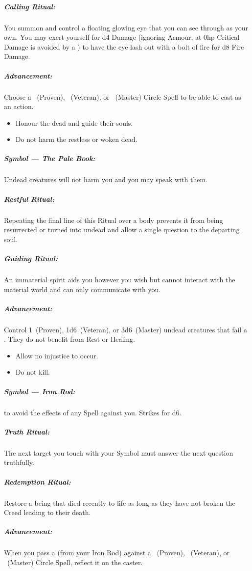 \documentclass[itdr/core]{subfiles}
\begin{document}
\subparagraph{Calling Ritual:} You summon and control a floating glowing eye that you can see through as your own. You may exert yourself for d4 Damage (ignoring Armour, at 0hp Critical Damage is avoided by a ) to have the eye lash out with a bolt of fire for d8 Fire Damage.

\subparagraph{Advancement:} Choose a ~(Proven), ~(Veteran), or ~(Master) Circle Spell to be able to cast as an action.

\creedskip

{\em\begin{itemize}
		\item Honour the dead and guide their souls.
		\item Do not harm the restless or woken dead.
\end{itemize}}

\subparagraph{Symbol --- The Pale Book:} Undead creatures will not harm you and you may speak with them.

\subparagraph{Restful Ritual:} Repeating the final line of this Ritual over a body prevents it from being resurrected or turned into undead and allow a single question to the departing soul.

\subparagraph{Guiding Ritual:} An immaterial spirit aids you however you wish but cannot interact with the material world and can only communicate with you.

\subparagraph{Advancement:} Control 1~(Proven), 1d6~(Veteran), or 3d6~(Master) undead creatures that fail a . They do not benefit from Rest or Healing.

\break

{\em\begin{itemize}
		\item Allow no injustice to occur.
		\item Do not kill.
\end{itemize}}

\subparagraph{Symbol --- Iron Rod:}  to avoid the effects of any Spell against you. Strikes for d6.

\subparagraph{Truth Ritual:} The next target you touch with your Symbol must answer the next question truthfully.

\subparagraph{Redemption Ritual:} Restore a being that died recently to life as long as they have not broken the Creed leading to their death.

\subparagraph{Advancement:} When you pass a  (from your Iron Rod) against a ~(Proven), ~(Veteran), or ~(Master) Circle Spell, reflect it on the caster.
\end{document}
